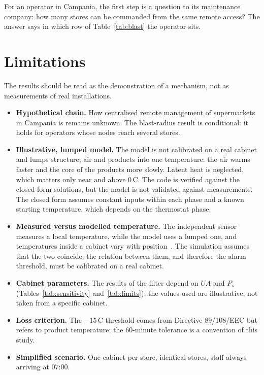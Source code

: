 \documentclass{ceurart}
\newcommand{\degC}{\,\textdegree{}C}
\begin{document}
For an operator in Campania, the first step is a question to its maintenance company: how many stores can be commanded from the same remote access?
The answer says in which row of Table~\ref{tab:blast} the operator sits.

\section{Limitations}
\label{sec:limitations}

The results should be read as the demonstration of a mechanism, not as measurements of real installations.
\begin{itemize}
  \item \textbf{Hypothetical chain.} How centralised remote management of supermarkets in Campania is remains unknown. The blast-radius result is conditional: it holds for operators whose nodes reach several stores.
  \item \textbf{Illustrative, lumped model.} The model is not calibrated on a real cabinet and lumps structure, air and products into one temperature: the air warms faster and the core of the products more slowly. Latent heat is neglected, which matters only near and above 0\degC. The code is verified against the closed-form solutions, but the model is not validated against measurements. The closed form assumes constant inputs within each phase and a known starting temperature, which depends on the thermostat phase.
  \item \textbf{Measured versus modelled temperature.} The independent sensor measures a local temperature, while the model uses a lumped one, and temperatures inside a cabinet vary with position~\cite{evans2007cabinets}. The simulation assumes that the two coincide; the relation between them, and therefore the alarm threshold, must be calibrated on a real cabinet.
  \item \textbf{Cabinet parameters.} The results of the filter depend on $UA$ and $P_s$ (Tables~\ref{tab:sensitivity} and~\ref{tab:limits}); the values used are illustrative, not taken from a specific cabinet.
  \item \textbf{Loss criterion.} The $-15$\degC{} threshold comes from Directive 89/108/EEC but refers to product temperature; the 60-minute tolerance is a convention of this study.
  \item \textbf{Simplified scenario.} One cabinet per store, identical stores, staff always arriving at 07:00.

\end{itemize}
\end{document}
